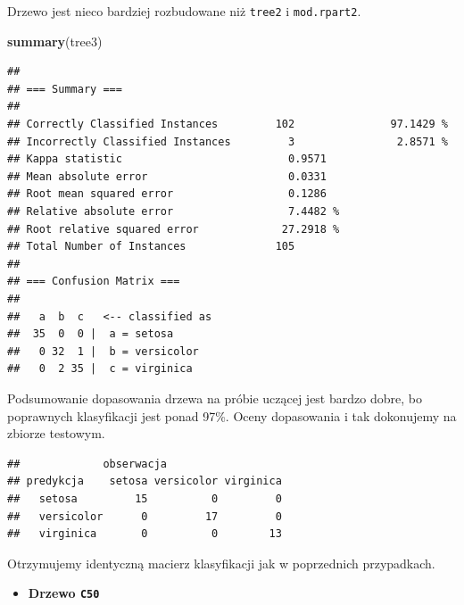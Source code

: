 \documentclass[
]{book}
\newenvironment{Shaded}{\begin{snugshade}}{\end{snugshade}}
\newcommand{\DataTypeTok}[1]{\textcolor[rgb]{0.13,0.29,0.53}{#1}}
\newcommand{\KeywordTok}[1]{\textcolor[rgb]{0.13,0.29,0.53}{\textbf{#1}}}
\newcommand{\NormalTok}[1]{#1}
\newcommand{\OperatorTok}[1]{\textcolor[rgb]{0.81,0.36,0.00}{\textbf{#1}}}
\newcommand{\StringTok}[1]{\textcolor[rgb]{0.31,0.60,0.02}{#1}}
\providecommand{\tightlist}{%
  \setlength{\itemsep}{0pt}\setlength{\parskip}{0pt}}
\theoremstyle{plain}
\theoremstyle{definition}
\theoremstyle{definition}
\theoremstyle{definition}
\theoremstyle{definition}
\theoremstyle{remark}
\begin{document}
Drzewo jest nieco bardziej rozbudowane niż \texttt{tree2} i \texttt{mod.rpart2}.

\begin{Shaded}
\begin{Highlighting}[]
\KeywordTok{summary}\NormalTok{(tree3)}
\end{Highlighting}
\end{Shaded}

\begin{verbatim}
## 
## === Summary ===
## 
## Correctly Classified Instances         102               97.1429 %
## Incorrectly Classified Instances         3                2.8571 %
## Kappa statistic                          0.9571
## Mean absolute error                      0.0331
## Root mean squared error                  0.1286
## Relative absolute error                  7.4482 %
## Root relative squared error             27.2918 %
## Total Number of Instances              105     
## 
## === Confusion Matrix ===
## 
##   a  b  c   <-- classified as
##  35  0  0 |  a = setosa
##   0 32  1 |  b = versicolor
##   0  2 35 |  c = virginica
\end{verbatim}

Podsumowanie dopasowania drzewa na próbie uczącej jest bardzo dobre, bo poprawnych klasyfikacji jest ponad 97\%. Oceny dopasowania i tak dokonujemy na zbiorze testowym.

\begin{Shaded}
\end{Shaded}

\begin{verbatim}
##             obserwacja
## predykcja    setosa versicolor virginica
##   setosa         15          0         0
##   versicolor      0         17         0
##   virginica       0          0        13
\end{verbatim}

Otrzymujemy identyczną macierz klasyfikacji jak w poprzednich przypadkach.

\begin{itemize}
\tightlist
\item
  \textbf{Drzewo \texttt{C50}}
\end{itemize}
\end{document}

